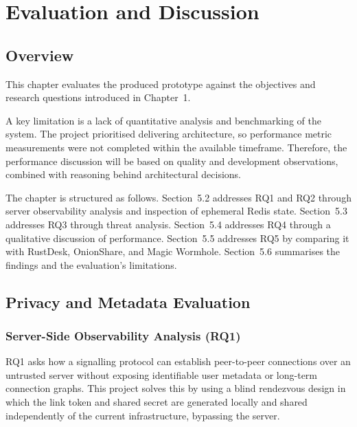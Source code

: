 \documentclass[12pt,a4paper,oneside]{report}
\begin{document}
\chapter{Evaluation and Discussion}
\label{ch:evaluation}

\section{Overview}
\label{sec:eval-overview}

This chapter evaluates the produced prototype against the objectives and research questions introduced in Chapter~1.

A key limitation is a lack of quantitative analysis and benchmarking of the system. The project prioritised delivering architecture, so performance metric measurements were not completed within the available timeframe. Therefore, the performance discussion will be based on quality and development observations, combined with reasoning behind architectural decisions.

The chapter is structured as follows. Section~5.2 addresses RQ1 and RQ2 through server observability analysis and inspection of ephemeral Redis state. Section~5.3 addresses RQ3 through threat analysis. Section~5.4 addresses RQ4 through a qualitative discussion of performance. Section~5.5 addresses RQ5 by comparing it with RustDesk, OnionShare, and Magic Wormhole. Section~5.6 summarises the findings and the evaluation's limitations.


\section{Privacy and Metadata Evaluation}
\label{sec:privacy-eval}

\subsection{Server-Side Observability Analysis (RQ1)}
\label{sec:rq1}

RQ1 asks how a signalling protocol can establish peer-to-peer connections over an untrusted server without exposing identifiable user metadata or long-term connection graphs. This project solves this by using a blind rendezvous design in which the link token and shared secret are generated locally and shared independently of the current infrastructure, bypassing the server.
\end{document}
